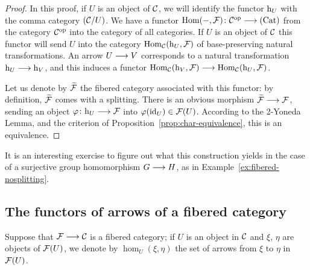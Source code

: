 \begin{3   FIBERED CATEGORIES}
\begin{3.6 Objects as fibcats and the 2-Yoneda}
\begin{proof}
In this proof, if $U$ is an object of $\mathcal{C}$, we will identify the functor $\mathrm{h}_{U}$ with the comma category $(\mathcal{C}/U)$. We have a functor $\hom(-, \cF) \colon \cC\op \arr \cat{Cat}$ from the category $\mathcal{C}^{\mathrm{op}}$ into the category of all categories. If $U$ is an object of $\mathcal{C}$ this functor will send $U$ into the category $\operatorname{Hom}_{\mathcal{C}}(\mathrm{h}_{U}, \mathcal{F})$ of base-preserving natural transformations. An arrow $U \arr V$ corresponds to a natural transformation $\h_{U} \arr \h_{V}$, and this induces a functor $\hom_{\cC}(\h_{V}, \cF) \arr \hom_{\cC}(\h_{U}, \cF)$.

Let us denote by $\widetilde{\mathcal{F}}$ the fibered category associated with this functor: by definition, $\widetilde{\mathcal{F}}$ comes with a splitting. There is an obvious morphism $\widetilde{\cF} \arr \cF$, sending an object $\phi \colon \h_{U} \arr \cF$ into $\varphi(\mathrm{id}_{U}) \in \mathcal{F}(U)$. According to the 2-Yoneda Lemma, and the criterion of Proposition~\ref{prop:char-equivalence}, this is an equivalence.
\end{proof}

It is an interesting exercise to figure out what this construction yields in the case of a surjective group homomorphism $G \arr H$, as in Example~\ref{ex:fibered-nosplitting}.




\end{3.6 Objects as fibcats and the 2-Yoneda}
\begin{3.7 The functors of arrows of a fibcat}
\setcounter{section}{6}
\section{The functors of arrows of a fibered category}
\label{sec:func-arrows}


Suppose that $\cF \arr \cC$ is a fibered category; if $U$ is an object in $\mathcal{C}$ and $\xi$, $\eta$ are objects of $\mathcal{F}(U)$, we denote by $\hom_U(\xi, \eta)$ the set of arrows from $\xi$ to $\eta$ in $\mathcal{F}(U)$.


\end{3.7 The functors of arrows of a fibcat}
\end{3   FIBERED CATEGORIES}
